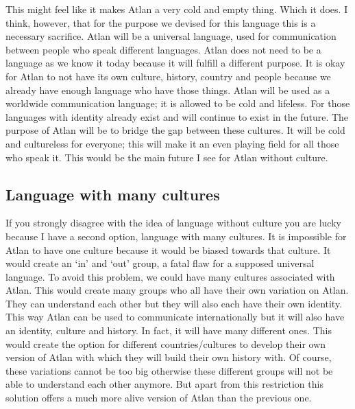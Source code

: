 This might feel like it makes Atlan a very cold and empty thing. Which it does. I think, however, that for the purpose we devised for this language this is a necessary sacrifice. Atlan will be a universal language, used for communication between people who speak different languages. Atlan does not need to be a language as we know it today because it will fulfill a different purpose. It is okay for Atlan to not have its own culture, history, country and people because we already have enough language who have those things. Atlan will be used as a worldwide communication language; it is allowed to be cold and lifeless. For those languages with identity already exist and will continue to exist in the future. The purpose of Atlan will be to bridge the gap between these cultures. It will be cold and cultureless for everyone; this will make it an even playing field for all those who speak it. This would be the main future I see for Atlan without culture.  

\subsection{Language with many cultures} 

If you strongly disagree with the idea of language without culture you are lucky because I have a second option, language with many cultures. It is impossible for Atlan to have one culture because it would be biased towards that culture. It would create an ‘in’ and ‘out’ group, a fatal flaw for a supposed universal language. To avoid this problem, we could have many cultures associated with Atlan. This would create many groups who all have their own variation on Atlan. They can understand each other but they will also each have their own identity. This way Atlan can be used to communicate internationally but it will also have an identity, culture and history. In fact, it will have many different ones. This would create the option for different countries/cultures to develop their own version of Atlan with which they will build their own history with. Of course, these variations cannot be too big otherwise these different groups will not be able to understand each other anymore. But apart from this restriction this solution offers a much more alive version of Atlan than the previous one.  

